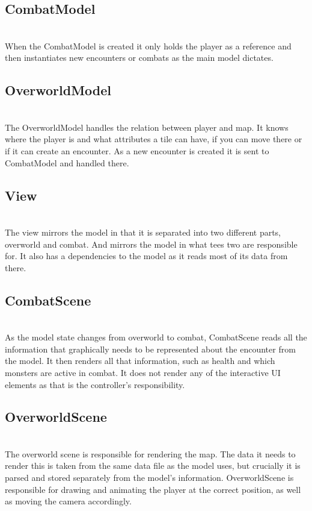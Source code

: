 \subsection{CombatModel}
\label{combatmodel}
\\
When the CombatModel is created it only holds the player as a reference and then instantiates new encounters or combats as the main model dictates.

\subsection{OverworldModel}
\label{overworldmodel}
\\
The OverworldModel handles the relation between player and map. It knows where the player is and what attributes a tile can have, if you can move there or if it can create an encounter. As a new encounter is created it is sent to CombatModel and handled there.

\subsection{View}
\label{view}
\\
The view mirrors the model in that it is separated into two different parts, overworld and combat. And mirrors the model in what tees two are responsible for. It also has a dependencies to the model as it reads most of its data from there.

\subsection{CombatScene}
\label{combatscene}
\\
As the model state changes from overworld to combat, CombatScene reads all the information that graphically needs to be represented about the encounter from the model. It then renders all that information, such as health and which monsters are active in combat. It does not render any of the interactive UI elements as that is the controller's responsibility.

\subsection{OverworldScene}
\label{overworldscene}
\\
The overworld scene is responsible for rendering the map. The data it needs to render this is taken from the same data file as the model uses, but crucially it is parsed and stored separately from the model's information. OverworldScene is responsible for drawing and animating the player at the correct position, as well as moving the camera accordingly.


